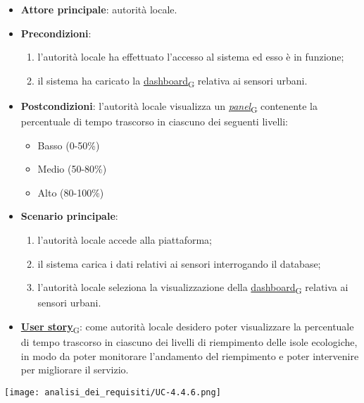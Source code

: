 \newpage
{}
\begin{itemize}
	\item \textbf{Attore principale}: autorità locale.
	\item \textbf{Precondizioni}:
	      \begin{enumerate}
		      \item l'autorità locale ha effettuato l'accesso al sistema ed esso è in funzione;
		      \item il sistema ha caricato la \href{https://7last.github.io/docs/pb/documentazione-interna/glossario\#dashboard}{dashboard\textsubscript{G}} relativa ai sensori urbani.
	      \end{enumerate}
	\item \textbf{Postcondizioni}: l'autorità locale visualizza un \href{https://7last.github.io/docs/pb/documentazione-interna/glossario\#panel}{\textit{panel}\textsubscript{G}} contenente la percentuale di tempo trascorso in ciascuno dei seguenti livelli:
	      \begin{itemize}
		      \item Basso (0-50\%)
		      \item Medio (50-80\%)
		      \item Alto (80-100\%)
	      \end{itemize}
	\item \textbf{Scenario principale}:
	      \begin{enumerate}
		      \item l'autorità locale accede alla piattaforma;
		      \item il sistema carica i dati relativi ai sensori interrogando il database;
		      \item l'autorità locale seleziona la visualizzazione della \href{https://7last.github.io/docs/pb/documentazione-interna/glossario\#dashboard}{dashboard\textsubscript{G}} relativa ai sensori urbani.
	      \end{enumerate}
	\item \href{https://7last.github.io/docs/pb/documentazione-interna/glossario\#user-story}{\textbf{User story}\textsubscript{G}}:
	      come autorità locale desidero poter visualizzare la percentuale di tempo trascorso in ciascuno dei livelli di riempimento delle isole ecologiche,
	      in modo da poter monitorare l'andamento del riempimento e poter intervenire per migliorare il servizio.
\end{itemize}
\begin{center}
	\texttt{[image: analisi\_dei\_requisiti/UC-4.4.6.png]}
\end{center}

